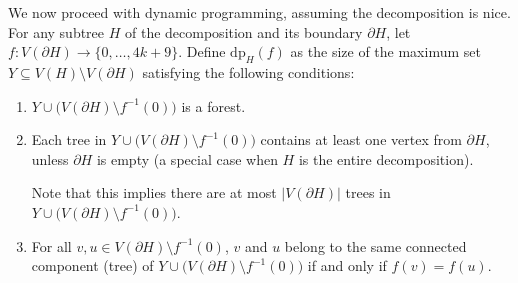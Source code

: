 \documentclass[12pt]{article}
\begin{document}
	We now proceed with dynamic programming, assuming the decomposition is nice.
	For any subtree \(H\) of the decomposition and its boundary \(\partial H\),
	let \(f : V(\partial H) \to \{0, \ldots, 4k + 9\}\). Define
	\(\text{dp}_{H}(f)\) as the size of the maximum set \(Y \subseteq V(H)
	\setminus V(\partial H)\) satisfying the following conditions:
	\begin{enumerate}
		\item \(Y \cup \big( V(\partial H) \setminus f^{-1}(0) \big)\) is a
		      forest.
		
		\item Each tree in \(Y \cup \big( V(\partial H) \setminus f^{-1}(0)
		      \big)\) contains at least one vertex from \(\partial H\), unless
		      \(\partial H\) is empty (a special case when \(H\) is the entire
		      decomposition).
		      
		      Note that this implies there are at most \(|V(\partial H)|\) trees
		      in \(Y \cup \big( V(\partial H) \setminus f^{-1}(0) \big)\).
		
		\item For all \(v, u \in V(\partial H) \setminus f^{-1}(0)\), \(v\) and
		      \(u\) belong to the same connected component (tree) of \(Y \cup
		      \big( V(\partial H) \setminus f^{-1}(0) \big)\) if and only if
		      \(f(v) = f(u)\).
	\end{enumerate}
	
	\medskip
	
\end{document}
